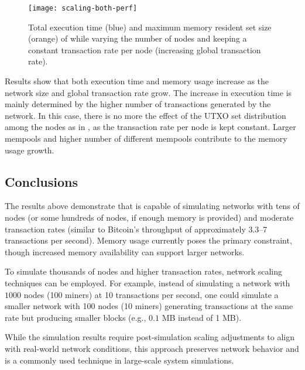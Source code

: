 \begin{figure}[tbhp]
	\centering
	\texttt{[image: scaling-both-perf]}
	\caption{Total execution time (blue) and maximum memory resident set
	size (orange) of \iblock{} while varying the number of nodes and
	keeping a constant transaction rate per node (increasing global
	transaction rate).}\label{fig:scaling-both}
\end{figure}

Results show that both execution time and memory usage increase as the network
size and global transaction rate grow. The increase in execution time is mainly
determined by the higher number of transactions generated by the network. In
this case, there is no more the effect of the UTXO set distribution among the
nodes as in , as the transaction rate per node is
kept constant. Larger mempools and higher number of different mempools
contribute to the memory usage growth.

\subsection{Conclusions}\label{subsec:performance-conclusions}

The results above demonstrate that \iblock{} is capable of simulating networks
with tens of nodes (or some hundreds of nodes, if enough memory is provided)
and moderate transaction rates (similar to Bitcoin's throughput of
approximately \(3.3\)--7 transactions per second). Memory usage currently poses
the primary constraint, though increased memory availability can support larger
networks.

To simulate thousands of nodes and higher transaction rates, network scaling
techniques can be employed. For example, instead of simulating a network with
\(1000\) nodes (100 miners) at 10 transactions per second, one could simulate a
smaller network with 100 nodes (10 miners) generating transactions at the same
rate but producing smaller blocks (e.g., \(0.1\) MB instead of 1 MB).

While the simulation results require post-simulation scaling adjustments to
align with real-world network conditions, this approach preserves network
behavior and is a commonly used technique in large-scale system simulations.
